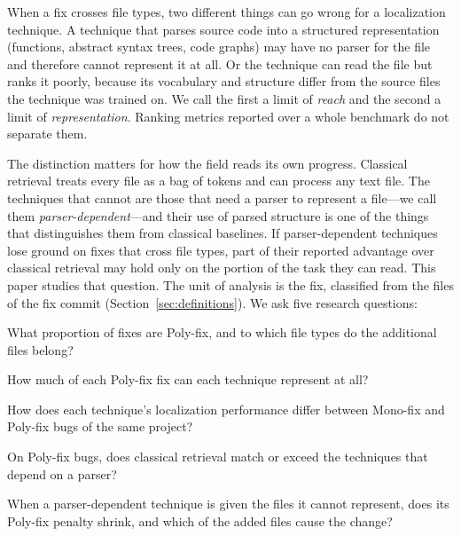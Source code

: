 \documentclass[a4paper,fleqn]{cas-dc}
\begin{document}
When a fix crosses file types, two different things can go wrong for a
localization technique. A technique that parses source code into a structured
representation (functions, abstract syntax trees, code graphs) may have no
parser for the file and therefore cannot represent it at all. Or the technique
can read the file but ranks it poorly, because its vocabulary and structure
differ from the source files the technique was trained on. We call the first
a limit of \emph{reach} and the second a limit of \emph{representation}.
Ranking metrics reported over a whole benchmark do not separate them.

The distinction matters for how the field reads its own progress. Classical
retrieval treats every file as a bag of tokens and can process any text file.
The techniques that cannot are those that need a parser to represent a
file---we call them \emph{parser-dependent}---and their use of parsed
structure is one of the things that distinguishes them from classical
baselines. If parser-dependent techniques
lose ground on fixes that cross file types, part of their reported advantage
over classical retrieval may hold only on the portion of the task they can
read. This paper studies that question. The unit of
analysis is the fix, classified from the files of the fix commit
(Section~\ref{sec:definitions}). We ask five research questions:

\begin{description}[leftmargin=0pt,itemsep=2pt]
\item[RQ1 (Prevalence).] What proportion of fixes are Poly-fix, and to which
  file types do the additional files belong?
\item[RQ2 (Reach).] How much of each Poly-fix fix can each technique
  represent at all?
\item[RQ3 (Performance by fix type).] How does each technique's localization
  performance differ between Mono-fix and Poly-fix bugs of the same project?
\item[RQ4 (Classical baseline).] On Poly-fix bugs, does classical retrieval
  match or exceed the techniques that depend on a parser?
\item[RQ5 (Reach or representation).] When a parser-dependent technique is
  given the files it cannot represent, does its Poly-fix penalty shrink, and
  which of the added files cause the change?
\end{description}
\end{document}
